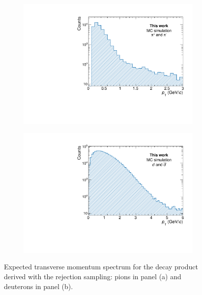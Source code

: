 \begin{figure}
\begin{subfigure}{.5\textwidth}
  \centering
  \captionsetup{justification=centering}
  \includegraphics[width=\linewidth]{gfx/pi_spectrum}
  \caption{}
  \label{fig:pi_spectrum}
\end{subfigure}%
\begin{subfigure}{.5\textwidth}
  \centering
  \captionsetup{justification=centering}
  \includegraphics[width=\linewidth]{gfx/deu_spectrum}
  \caption{}
  \label{fig:deu_spectrum}
\end{subfigure}
\caption{Expected transverse momentum spectrum for the \ds decay product derived with the rejection sampling: pions in panel (a) and deuterons in panel (b).}
\label{fig:BW_spec_prod}
\end{figure}

